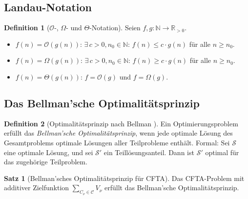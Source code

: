 ﻿\documentclass[a4paper,12pt]{article}
\theoremstyle{definition}
\newtheorem{definition}{Definition}
\newtheorem{satz}{Satz}
\begin{document}
\subsection{Landau-Notation}

\begin{definition}[$\mathcal{O}$-, $\Omega$- und $\Theta$-Notation]
    Seien $f, g: \mathbb{N} \to \mathbb{R}_{>0}$.
    \begin{itemize}
        \item $f(n) = \mathcal{O}(g(n))$: $\exists\, c > 0, n_0 \in \mathbb{N}$:
              $f(n) \leq c \cdot g(n)$ f\"{u}r alle $n \geq n_0$.
        \item $f(n) = \Omega(g(n))$: $\exists\, c > 0, n_0 \in \mathbb{N}$:
              $f(n) \geq c \cdot g(n)$ f\"{u}r alle $n \geq n_0$.
        \item $f(n) = \Theta(g(n))$: $f = \mathcal{O}(g)$ und $f = \Omega(g)$.
    \end{itemize}
\end{definition}

\subsection{Das Bellman'sche Optimalit\"{a}tsprinzip}

\begin{definition}[Optimalit\"{a}tsprinzip nach Bellman \cite{bellman1957}]
    Ein Optimierungsproblem erf\"{u}llt das \emph{Bellman'sche Optimalit\"{a}tsprinzip},
    wenn jede optimale L\"{o}sung des Gesamtproblems optimale L\"{o}sungen aller
    Teilprobleme enth\"{a}lt. Formal: Sei $\mathcal{S}$ eine optimale L\"{o}sung,
    und sei $\mathcal{S}'$ ein Teill\"{o}sungsanteil. Dann ist $\mathcal{S}'$
    optimal f\"{u}r das zugeh\"{o}rige Teilproblem.
\end{definition}

\begin{satz}[Bellman'sches Optimalit\"{a}tsprinzip f\"{u}r CFTA]
    \label{satz:bellman_cfta}
    Das CFTA-Problem mit additiver Zielfunktion
    $\sum_{C_\nu \in \mathcal{C}} V_\nu$ erf\"{u}llt das Bellman'sche
    Optimalit\"{a}tsprinzip.
\end{satz}
\end{document}

